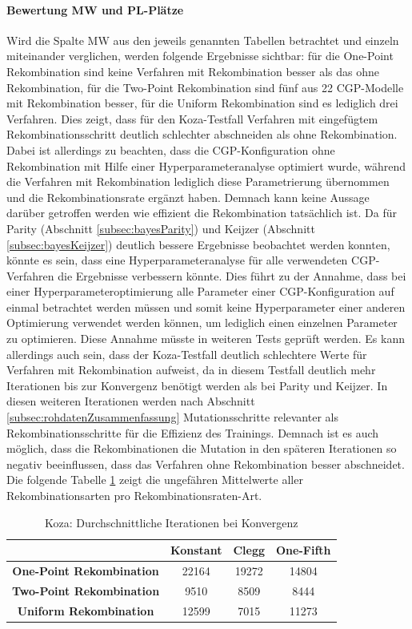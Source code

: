 \paragraph{Bewertung MW und PL-Plätze}
Wird die Spalte MW aus den jeweils genannten Tabellen betrachtet und einzeln miteinander verglichen, werden folgende Ergebnisse sichtbar: für die One-Point Rekombination sind keine Verfahren mit Rekombination besser als das ohne Rekombination, für die Two-Point Rekombination sind fünf aus 22 CGP-Modelle mit Rekombination besser, für die Uniform Rekombination sind es lediglich drei Verfahren.
Dies zeigt, dass für den Koza-Testfall Verfahren mit eingefügtem Rekombinationsschritt deutlich schlechter abschneiden als ohne Rekombination.
Dabei ist allerdings zu beachten, dass die CGP-Konfiguration ohne Rekombination mit Hilfe einer Hyperparameteranalyse optimiert wurde, während die Verfahren mit Rekombination lediglich diese Parametrierung übernommen und die Rekombinationsrate ergänzt haben.
Demnach kann keine Aussage darüber getroffen werden wie effizient die Rekombination tatsächlich ist.
Da für Parity (Abschnitt \ref{subsec:bayesParity}) und Keijzer (Abschnitt \ref{subsec:bayesKeijzer}) deutlich bessere Ergebnisse beobachtet werden konnten, könnte es sein, dass eine Hyperparameteranalyse für alle verwendeten CGP-Verfahren die Ergebnisse verbessern könnte.
Dies führt zu der Annahme, dass bei einer Hyperparameteroptimierung alle Parameter einer CGP-Konfiguration auf einmal betrachtet werden müssen und somit keine Hyperparameter einer anderen Optimierung verwendet werden können, um lediglich einen einzelnen Parameter zu optimieren.
Diese Annahme müsste in weiteren Tests geprüft werden.
Es kann allerdings auch sein, dass der Koza-Testfall deutlich schlechtere Werte für Verfahren mit Rekombination aufweist, da in diesem Testfall deutlich mehr Iterationen bis zur Konvergenz benötigt werden als bei Parity und Keijzer.
In diesen weiteren Iterationen werden nach Abschnitt \ref{subsec:rohdatenZusammenfassung} Mutationsschritte relevanter als Rekombinationsschritte für die Effizienz des Trainings.
Demnach ist es auch möglich, dass die Rekombinationen die Mutation in den späteren Iterationen so negativ beeinflussen, dass das Verfahren ohne Rekombination besser abschneidet.\\
Die folgende Tabelle \ref{table:kozaMW} zeigt die ungefähren Mittelwerte aller Rekombinationsarten pro Rekombinationsraten-Art. 

\begin{table}[H]
	\centering
	\begin{tabular} {c | c | c | c}
		& \textbf{Konstant} & \textbf{Clegg} & \textbf{One-Fifth} \\
		\hline
		\textbf{One-Point Rekombination} & 22164 & 19272 & 14804\\
		\hline
		\textbf{Two-Point Rekombination} & 9510 & 8509 & 8444 \\
		\hline
		\textbf{Uniform Rekombination} & 12599 & 7015 & 11273 \\
	\end{tabular}
	\caption{Koza: Durchschnittliche Iterationen bei Konvergenz}
	\label{table:kozaMW}
\end{table}

